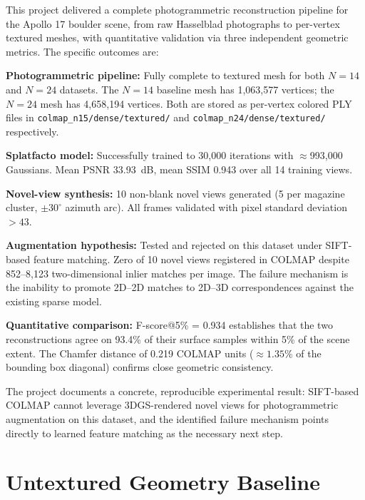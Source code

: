 \documentclass[12pt]{article}
\begin{document}
This project delivered a complete photogrammetric reconstruction pipeline for the Apollo 17 boulder scene, from raw Hasselblad photographs to per-vertex textured meshes, with quantitative validation via three independent geometric metrics. The specific outcomes are:

\textbf{Photogrammetric pipeline:} Fully complete to textured mesh for both $N{=}14$ and $N{=}24$ datasets. The $N{=}14$ baseline mesh has 1,063,577 vertices; the $N{=}24$ mesh has 4,658,194 vertices. Both are stored as per-vertex colored PLY files in \texttt{colmap\_n15/dense/textured/} and \texttt{colmap\_n24/dense/textured/} respectively.

\textbf{Splatfacto model:} Successfully trained to 30,000 iterations with $\approx$993,000 Gaussians. Mean PSNR 33.93~dB, mean SSIM 0.943 over all 14 training views.

\textbf{Novel-view synthesis:} 10 non-blank novel views generated (5 per magazine cluster, $\pm 30^\circ$ azimuth arc). All frames validated with pixel standard deviation $> 43$.

\textbf{Augmentation hypothesis:} Tested and rejected on this dataset under SIFT-based feature matching. Zero of 10 novel views registered in COLMAP despite 852--8,123 two-dimensional inlier matches per image. The failure mechanism is the inability to promote 2D--2D matches to 2D--3D correspondences against the existing sparse model.

\textbf{Quantitative comparison:} F-score@5\% = 0.934 establishes that the two reconstructions agree on 93.4\% of their surface samples within 5\% of the scene extent. The Chamfer distance of 0.219 COLMAP units ($\approx 1.35\%$ of the bounding box diagonal) confirms close geometric consistency.

The project documents a concrete, reproducible experimental result: SIFT-based COLMAP cannot leverage 3DGS-rendered novel views for photogrammetric augmentation on this dataset, and the identified failure mechanism points directly to learned feature matching as the necessary next step.

\clearpage
\appendix

\section{Untextured Geometry Baseline}
\end{document}
